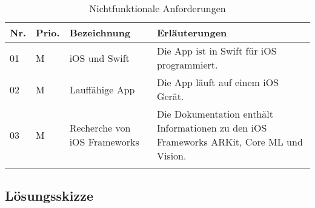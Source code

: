 \begin{longtable}{l l p{4.7cm} p{8cm}}
	\hline
	\textbf{Nr.} & \textbf{Prio.} & \textbf{Bezeichnung} & \textbf{Erläuterungen} \\
	\hline
	01 & M & iOS und Swift & Die App ist in Swift für iOS programmiert. \\
	02 & M & Lauffähige App & Die App läuft auf einem iOS Gerät. \\
	03 & M & Recherche von iOS Frameworks & Die Dokumentation enthält Informationen zu den iOS Frameworks ARKit, Core ML und Vision. \\
	\hline
	\caption{Nichtfunktionale Anforderungen}
	\label{tab:nichtfunktionale-anforderungen}
\end{longtable}

\subsection{Lösungsskizze}
